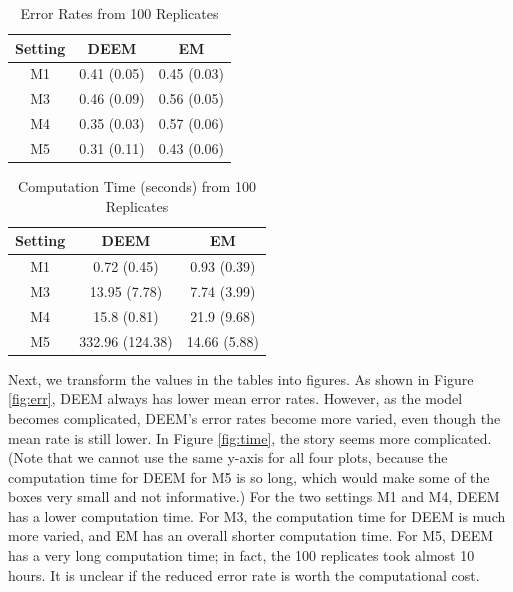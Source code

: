 \documentclass[11pt]{article}
\begin{document}
\begin{table}[H]
    \centering
    \begin{tabular}{|c|cc|}
    \hline
       Setting  &  DEEM & EM \\
       \hline
         M1 & 0.41 (0.05) & 0.45 (0.03) \\
         M3 &  0.46 (0.09) & 0.56 (0.05) \\
         M4 &  0.35 (0.03) & 0.57 (0.06) \\ 
         M5 &  0.31 (0.11) & 0.43 (0.06) \\
    \hline
    \end{tabular}
    \caption{Error Rates from 100 Replicates}
    \label{tab:err}
\end{table}

\begin{table}[H]
    \centering
    \begin{tabular}{|c|cc|}
    \hline
       Setting  &  DEEM & EM \\
       \hline
         M1 & 0.72 (0.45) & 0.93 (0.39) \\
         M3 &  13.95 (7.78) & 7.74 (3.99) \\
         M4 &  15.8 (0.81) & 21.9 (9.68) \\ 
         M5 &  332.96 (124.38) & 14.66 (5.88) \\
    \hline
    \end{tabular}
    \caption{Computation Time (seconds) from 100 Replicates}
    \label{tab:time}
\end{table}

Next, we transform the values in the tables into figures. As shown in Figure \ref{fig:err}, DEEM always has lower mean error rates. However, as the model becomes complicated, DEEM's error rates become more varied, even though the mean rate is still lower. In Figure \ref{fig:time}, the story seems more complicated. (Note that we cannot use the same y-axis for all four plots, because the computation time for DEEM for M5 is so long, which would make some of the boxes very small and not informative.) For the two settings M1 and M4, DEEM has a lower computation time. For M3, the computation time for DEEM is much more varied, and EM has an overall shorter computation time. For M5, DEEM has a very long computation time; in fact, the 100 replicates took almost 10 hours. It is unclear if the reduced error rate is worth the computational cost.
\end{document}
